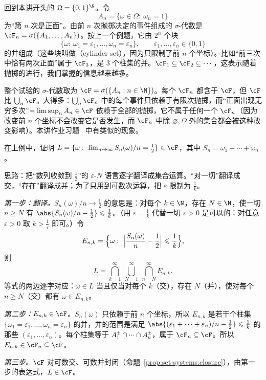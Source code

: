 \begin{example}\label{ex:set-systems:coin-tossing}
回到本讲开头的 $\Omega=\{0,1\}^{\N}$。令
\[
A_n=\{\omega\in\Omega:\ \omega_n=1\}
\]
为“第 $n$ 次是正面”。由前 $n$ 次抛掷决定的事件组成的 $\sigma$-代数是 $\cF_n=\sigma(\{A_1,\dots,A_n\})$。按上一个例题，它由 $2^n$ 个块
\[
\{\omega:\ \omega_1=\varepsilon_1,\dots,\omega_n=\varepsilon_n\},\qquad \varepsilon_1,\dots,\varepsilon_n\in\{0,1\}
\]
的并组成（这些块叫做（cylinder set），因为只限制了前 $n$ 个坐标）。比如“前三次中恰有两次正面”属于 $\cF_3$，是 $3$ 个柱集的并。$\cF_1\subseteq\cF_2\subseteq\cdots$，这表示随着抛掷的进行，我们掌握的信息越来越多。

整个试验的 $\sigma$-代数取为 $\cF=\sigma(\{A_n:n\in\N\})$。每个 $\cF_n$ 都含于 $\cF$，但 $\cF$ 比 $\bigcup_n\cF_n$ 大得多：$\bigcup_n\cF_n$ 中的每个事件只依赖于有限次抛掷，而“正面出现无穷多次”$=\limsup_nA_n\in\cF$ 依赖于全部的抛掷，它不属于任何一个 $\cF_n$（因为改变前 $n$ 个坐标不会改变它是否发生，而 $\cF_n$ 中除 $\varnothing,\Omega$ 外的集合都会被这种改变影响）。本讲作业习题~ 中有类似的现象。
\end{example}

\begin{workedexample}\label{we:set-systems:slln-event}
在上例中，证明 $L=\{\omega:\ \lim_{n\to\infty}S_n(\omega)/n=\frac12\}\in\cF$，其中 $S_n=\omega_1+\cdots+\omega_n$。
\end{workedexample}
\begin{solution}
思路：把“数列收敛到 $\frac12$”的 $\varepsilon$-$N$ 语言逐字翻译成集合运算。“对一切”翻译成交，“存在”翻译成并；为了只用到可数次运算，把 $\varepsilon$ 限制为 $\frac1k$。

\emph{第一步：翻译。}$S_n(\omega)/n\to\frac12$ 的意思是：对每个 $k\in\N$，存在 $N\in\N$，使一切 $n\geqslant N$ 有 $\abs{S_n(\omega)/n-\frac12}\leqslant\frac1k$。（用 $\varepsilon=\frac1k$ 代替一切 $\varepsilon>0$ 是可以的：对任意 $\varepsilon>0$ 取 $k>\frac1\varepsilon$ 即可。）令
\[
E_{n,k}=\Bigl\{\omega:\ \Bigl\lvert\frac{S_n(\omega)}n-\frac12\Bigr\rvert\leqslant\frac1k\Bigr\},
\]
则
\[
L=\bigcap_{k=1}^\infty\ \bigcup_{N=1}^\infty\ \bigcap_{n=N}^\infty E_{n,k}.
\]
等式的两边逐字对应：$\omega\in L$ 当且仅当对每个 $k$（交），存在 $N$（并），使对每个 $n\geqslant N$（交）都有 $\omega\in E_{n,k}$。

\emph{第二步：$E_{n,k}\in\cF$。}$S_n(\omega)$ 只依赖于前 $n$ 个坐标，所以 $E_{n,k}$ 是若干个柱集 $\{\omega_1=\varepsilon_1,\dots,\omega_n=\varepsilon_n\}$ 的并，并的范围是满足 $\abs{(\varepsilon_1+\cdots+\varepsilon_n)/n-\frac12}\leqslant\frac1k$ 的那些 $(\varepsilon_1,\dots,\varepsilon_n)$。每个柱集等于 $A_1^{\pm}\cap\cdots\cap A_n^{\pm}$，属于 $\cF_n\subseteq\cF$。所以 $E_{n,k}\in\cF_n\subseteq\cF$。

\emph{第三步。}$\cF$ 对可数交、可数并封闭（命题~\ref{prop:set-systems:closure}），由第一步的表达式，$L\in\cF$。
\end{solution}

